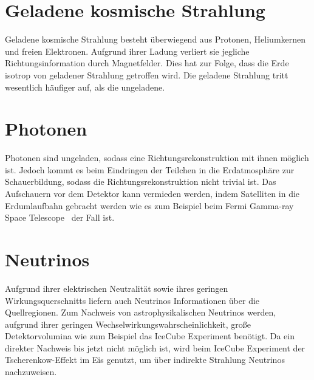 \section*{Geladene kosmische Strahlung}
Geladene kosmische Strahlung besteht überwiegend aus Protonen, Heliumkernen und freien Elektronen. 
Aufgrund ihrer Ladung verliert sie jegliche Richtungsinformation durch Magnetfelder. 
Dies hat zur Folge, dass die Erde isotrop von geladener Strahlung getroffen wird.
Die geladene Strahlung tritt wesentlich häufiger auf, als die ungeladene. 

\section*{Photonen}
Photonen sind ungeladen, sodass eine Richtungsrekonstruktion mit ihnen möglich ist. 
Jedoch kommt es beim Eindringen der Teilchen in die Erdatmosphäre zur Schauerbildung, sodass die Richtungsrekonstruktion nicht trivial ist. 
Das Aufschauern vor dem Detektor kann vermieden werden, indem Satelliten in die Erdumlaufbahn gebracht werden wie es zum Beispiel beim Fermi Gamma-ray Space Telescope~\cite{fermi} der Fall ist.

\section*{Neutrinos}
Aufgrund ihrer elektrischen Neutralität sowie ihres geringen Wirkungsquerschnitts liefern auch Neutrinos Informationen über die Quellregionen. 
Zum Nachweis von astrophysikalischen Neutrinos werden, aufgrund ihrer geringen Wechselwirkungswahrscheinlichkeit, große Detektorvolumina wie zum Beispiel das IceCube Experiment benötigt.
Da ein direkter Nachweis bis jetzt nicht möglich ist, wird beim IceCube Experiment \cite{icecube} der Tscherenkow-Effekt im Eis genutzt, um über indirekte Strahlung Neutrinos nachzuweisen.
